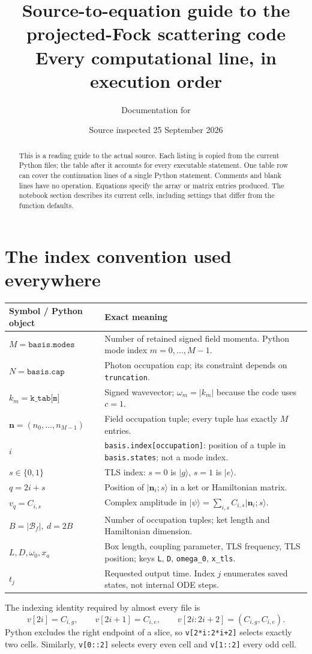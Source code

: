 \documentclass[11pt,a4paper]{article}
\title{Source-to-equation guide to the projected-Fock scattering code\\
\large Every computational line, in execution order}
\author{Documentation for \code{codex/code}}
\date{Source inspected 25 September 2026}
\newcommand{\ket}[1]{\lvert #1\rangle}
\newcommand{\code}[1]{\nolinkurl{#1}}
\newcommand{\Bf}{\mathcal B_f}
\begin{document}
\maketitle
\begin{abstract}
This is a reading guide to the actual source. Each listing is copied from the current
Python files; the table after it accounts for every executable statement. One table
row can cover the continuation lines of a single Python statement. Comments and
blank lines have no operation. Equations specify the array or matrix entries produced.
The notebook section describes its current cells, including settings that differ
from the function defaults.
\end{abstract}
\tableofcontents

\section{The index convention used everywhere}
\begin{center}\small
\begin{tabular}{p{}p{}}
\toprule Symbol / Python object & Exact meaning\\\midrule
$M=\texttt{basis.modes}$ & Number of retained signed field momenta. Python mode index $m=0,\ldots,M-1$.\\
$N=\texttt{basis.cap}$ & Photon occupation cap; its constraint depends on \code{truncation}.\\
$k_m=\texttt{k\_tab[m]}$ & Signed wavevector; $\omega_m=|k_m|$ because the code uses $c=1$.\\
$\mathbf n=(n_0,\ldots,n_{M-1})$ & Field occupation tuple; every tuple has exactly $M$ entries.\\
$i$ & \code{basis.index[occupation]}: position of a tuple in \code{basis.states}; not a mode index.\\
$s\in\{0,1\}$ & TLS index: $s=0$ is $\ket g$, $s=1$ is $\ket e$.\\
$q=2i+s$ & Position of $\ket{\mathbf n_i;s}$ in a ket or Hamiltonian matrix.\\
$v_q=C_{i,s}$ & Complex amplitude in $\ket\psi=\sum_{i,s}C_{i,s}\ket{\mathbf n_i;s}$.\\
$B=|\Bf|,\ d=2B$ & Number of occupation tuples; ket length and Hamiltonian dimension.\\
$L,D,\omega_0,x_a$ & Box length, coupling parameter, TLS frequency, TLS position; keys \code{L}, \code{D}, \code{omega_0}, \code{x_tls}.\\
$t_j$ & Requested output time. Index $j$ enumerates saved states, not internal ODE steps.\\
\bottomrule
\end{tabular}
\end{center}
The indexing identity required by almost every file is
\begin{equation}
\boxed{v[2i]=C_{i,g},\qquad v[2i+1]=C_{i,e},\qquad
v[2i:2i+2]=(C_{i,g},C_{i,e}).}
\label{eq:slice}
\end{equation}
Python excludes the right endpoint of a slice, so \code{v[2*i:2*i+2]}
selects exactly two cells. Similarly, \code{v[0::2]} selects every even
cell and \code{v[1::2]} every odd cell.
\end{document}
